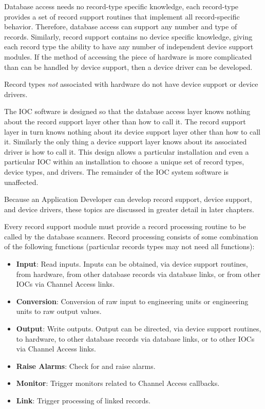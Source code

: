 Database access needs no record-type specific knowledge, each record-type provides a set of record support routines that implement all record-specific behavior.
Therefore, database access can support any number and type of records. Similarly, record support contains no device specific knowledge, giving each record type the ability to have any number of independent device support modules.
If the method of accessing the piece of hardware is more complicated than can be handled by device support, then a device driver can be developed.

Record types \emph{not} associated with hardware do not have device support or device drivers.

The IOC software is designed so that the database access layer knows nothing about the record support layer other than 
how to call it. The record support layer in turn knows nothing about its device support layer other than how to call it. 
Similarly the only thing a device support layer knows about its associated driver is how to call it. This design allows a 
particular installation and even a particular IOC within an installation to choose a unique set of record types, device types, 
and drivers. The remainder of the IOC system software is unaffected.

Because an Application Developer can develop record support, device support, and device drivers, these topics are 
discussed in greater detail in later chapters.

Every record support module must provide a record processing routine to be called by the database scanners. Record 
processing consists of some combination of the following functions (particular records types may not need all functions):

\begin{itemize}
\item \textbf{Input}:  Read inputs. Inputs can be obtained, via device support routines, from hardware, from other database 
records via database links, or from other IOCs via Channel Access links.

\item \textbf{Conversion}:  Conversion of raw input to engineering units or engineering units to raw output values.

\item \textbf{Output}:  Write outputs. Output can be directed, via device support routines, to hardware, to other database records 
via database links, or to other IOCs via Channel Access links.

\item \textbf{Raise Alarms}:  Check for and raise alarms.

\item \textbf{Monitor}:  Trigger monitors related to Channel Access callbacks.

\item \textbf{Link}:  Trigger processing of linked records.
\end{itemize}

